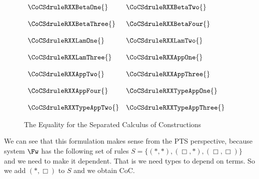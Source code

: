 \begin{figure}
  \begin{center}
    \begin{math}
      \begin{array}{lll}
        \CoCSdruleRXXBetaOne{} & \CoCSdruleRXXBetaTwo{}\\
        &\\
        \CoCSdruleRXXBetaThree{} & \CoCSdruleRXXBetaFour{}\\
        &\\
        \CoCSdruleRXXLamOne{} & \CoCSdruleRXXLamTwo{}\\
        &\\
        \CoCSdruleRXXLamThree{} & \CoCSdruleRXXAppOne{}\\
        &\\
        \CoCSdruleRXXAppTwo{} & \CoCSdruleRXXAppThree{}\\
        &\\
        \CoCSdruleRXXAppFour{} & \CoCSdruleRXXTypeAppOne{}\\
        &\\
        \CoCSdruleRXXTypeAppTwo{} & \CoCSdruleRXXTypeAppThree{}
      \end{array}
    \end{math}
  \end{center}
  \caption{The Equality for the Separated Calculus of Constructions}
  \label{fig:CoC_sep_red}
\end{figure}
We can see that this formulation makes sense from the PTS perspective,
because system $\Fw$ has the following set of rules $S = \{
(*,*),(\Box,*),(\Box,\Box)\}$ and we need to make it dependent.  That
is we need types to depend on terms.  So we add $(*,\Box)$ to $S$ and
we obtain CoC.  
